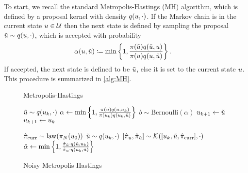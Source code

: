 \documentclass[12pt]{article}
\begin{document}
To start, we recall the standard Metropolis-Hastings (MH) algorithm, which is defined by a proposal 
kernel with density $\propDens(\Par, \cdot)$. If the Markov chain is in the current state 
$\Par \in \parSpace$ then the next state is defined by sampling the proposal
 $\propPar \sim \propDens(\Par, \cdot)$, which is accepted with probability
\begin{align}
&\accProbMH(\Par, \propPar) \Def 
\min\left\{1, \frac{\postDens(\propPar)\propDens(\propPar, \Par)}{\postDens(\Par) \propDens(\Par, \propPar)} \right\}.
\label{MH_acc_prob_exact}
\end{align}
If accepted, the next state is defined to be $\propPar$, else it is set to the current state $\Par$. 
This procedure is summarized in \cref{alg:MH}. 

\begin{figure}[ht]
\centering
\begin{minipage}[t]{0.495\textwidth}
    \captionsetup{type=algorithm}
    \caption{Metropolis-Hastings}
    \label{alg:MH}
    \begin{algorithmic}[1]
            \State $\tilde{\Par} \sim q(\Par_{k}, \cdot)$
            \State $\alpha \gets \min\left\{1, \frac{\pi(\tilde{\Par}) q(\tilde{\Par}, \Par_k)}{\pi(\Par_k) q(\Par_k, \tilde{\Par})} \right\}$
            \State $b \sim \text{Bernoulli}(\alpha)$
                \State $\Par_{k+1} \gets \tilde{\Par}$ 
            \Else
                \State $\Par_{k+1} \gets \Par_k$
            \EndIf
        \EndFor
    \EndFunction
    \end{algorithmic}
\end{minipage}
\hfill
\begin{minipage}[t]{0.495\textwidth}
    \captionsetup{type=algorithm}
    \caption{Noisy Metropolis-Hastings}
    \label{alg:MH-noisy}
    \begin{algorithmic}[1]
        \State $\hat{\pi}_{\text{curr}} \sim \mathrm{law}(\postEm[\Ndesign](\indexMCMC[0]{\Par}))$
            \State $\tilde{\Par} \sim q(\Par_k, \cdot)$
            \State $[\hat{\pi}_{\Par}, \hat{\pi}_{\tilde{\Par}}] \sim \postSampleKernel([\Par_k, \tilde{\Par}, \hat{\pi}_{\text{curr}}], \cdot)$
            \State $\hat{\alpha} \gets \min\left\{1, \frac{\hat{\pi}_{\tilde{\Par}} \cdot q(\tilde{\Par}, \Par_k)}{\hat{\pi}_{\Par} \cdot q(\Par_k, \tilde{\Par})} \right\}$

\end{algorithmic}
\end{minipage}
\end{figure}
\end{document}
